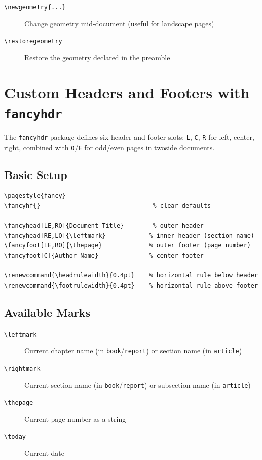 \documentclass[12pt,a4paper,twoside]{article}
\renewcommand{\headrulewidth}{0.4pt}
\renewcommand{\footrulewidth}{0.4pt}
\renewcommand{\headrulewidth}{0pt}
\renewcommand{\footrulewidth}{0pt}
\begin{document}
\begin{description}
    \item[\texttt{\textbackslash newgeometry\{...\}}]
        Change geometry mid-document (useful for landscape pages)
    \item[\texttt{\textbackslash restoregeometry}]
        Restore the geometry declared in the preamble
\end{description}

\lipsum[1]


\section{Custom Headers and Footers with \texttt{fancyhdr}}
\label{sec:fancyhdr}

The \texttt{fancyhdr} package defines six header and footer slots:
\texttt{L}, \texttt{C}, \texttt{R} for left, center, right, combined with
\texttt{O}/\texttt{E} for odd/even pages in twoside documents.

\subsection{Basic Setup}

\begin{verbatim}
\pagestyle{fancy}
\fancyhf{}                               % clear defaults

\fancyhead[LE,RO]{Document Title}        % outer header
\fancyhead[RE,LO]{\leftmark}            % inner header (section name)
\fancyfoot[LE,RO]{\thepage}             % outer footer (page number)
\fancyfoot[C]{Author Name}              % center footer

\renewcommand{\headrulewidth}{0.4pt}    % horizontal rule below header
\renewcommand{\footrulewidth}{0.4pt}    % horizontal rule above footer
\end{verbatim}

\subsection{Available Marks}

\begin{description}
    \item[\texttt{\textbackslash leftmark}]  Current chapter name (in \texttt{book}/\texttt{report})
                                              or section name (in \texttt{article})
    \item[\texttt{\textbackslash rightmark}] Current section name (in \texttt{book}/\texttt{report})
                                              or subsection name (in \texttt{article})
    \item[\texttt{\textbackslash thepage}]   Current page number as a string
    \item[\texttt{\textbackslash today}]     Current date
\end{description}
\end{document}
